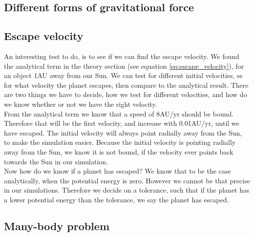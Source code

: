\documentclass[reprint, english,notitlepage,nofootinbib]{revtex4-1}  %
\begin{document}
\subsection{Different forms of gravitational force}

\subsection{Escape velocity}
An interesting test to do, is to see if we can find the escape velocity. We found the analytical term in the theory section (see equation \eqref{eq:escape_velocity}), for an object 1AU away from our Sun. We can test for different initial velocities, se for what velocity the planet escapes, then compare to the analytical result. There are two things we have to decide, how we test for different velocities, and how do we know whether or not we have the right velocity.
\\
From the analytical term we know that a speed of 8AU/yr should be bound. Therefore that will be the first velocity, and increase with 0.01AU/yr, until we have escaped. The initial velocity will always point radially away from the Sun, to make the simulation easier. Because the initial velocity is pointing radially away from the Sun, we know it is not bound, if the velocity ever points back towards the Sun in our simulation.
\\
Now how do we know if a planet has escaped? We know that to be the case analytically, when the potential energy is zero. However we cannot be that precise in our simulations. Therefore we decide on a tolerance, such that if the planet has a lower potential energy than the tolerance, we say the planet has escaped.

\subsection{Many-body problem}
\end{document}
